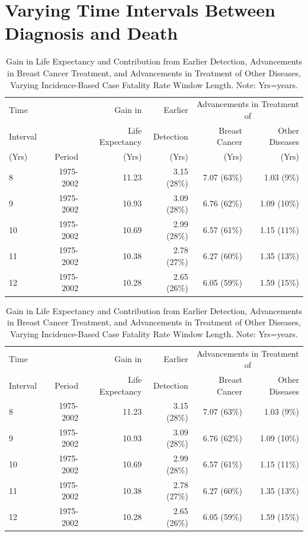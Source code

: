 \documentclass[11pt,letterpaper]{article}
\theoremstyle{plain}
\theoremstyle{remark}
\numberwithin{equation}{section}
\begin{document}
\section{Varying Time Intervals Between Diagnosis and Death}
\begin{center}
  \begin{table}[h]
\begin{tabular}{@{}l rrrrr@{}}
  \toprule
Time & & Gain in & Earlier & \multicolumn{2}{c}{Advancements in Treatment of}\\
 \cmidrule(l{1em}r{1em}){5-6}
Interval &  & Life Expectancy & Detection  & Breast Cancer   & Other Diseases  \\ 
(Yrs) &  Period & (Yrs) & (Yrs) & (Yrs) & (Yrs) \\
  \midrule
  8 & 1975-2002 & 11.23 & 3.15 (28\%) & 7.07 (63\%) & 1.03 (9\%) \\ 
    9 & 1975-2002 & 10.93 & 3.09 (28\%) & 6.76 (62\%) & 1.09 (10\%) \\ 
   10 & 1975-2002 & 10.69 & 2.99 (28\%) & 6.57 (61\%) & 1.15 (11\%) \\ 
   11 & 1975-2002 & 10.38 & 2.78 (27\%) & 6.27 (60\%) & 1.35 (13\%) \\ 
   12 & 1975-2002 & 10.28 & 2.65 (26\%) & 6.05 (59\%) & 1.59 (15\%) \\ 
   \bottomrule
\end{tabular}
\caption{Gain in Life Expectancy and Contribution from Earlier
  Detection, Advancements in Breast Cancer Treatment, and Advancements
  in Treatment of Other Diseases, Varying Incidence-Based Case
  Fatality Rate Window Length.  Note: Yrs=years.}
\end{table}
\end{center}

\begin{center}
  \begin{table}[h]
\begin{tabular}{@{}l rrrrr@{}}
 Time & & Gain in & Earlier & \multicolumn{2}{c}{Advancements in Treatment of}\\
 \cmidrule(l{1em}r{1em}){5-6}
Interval &  Period& Life Expectancy & Detection  & Breast Cancer   & Other Diseases  \\ 
  \midrule
  8 & 1975-2002 & 11.23 & 3.15 (28\%) & 7.07 (63\%) & 1.03 (9\%) \\ 
    9 & 1975-2002 & 10.93 & 3.09 (28\%) & 6.76 (62\%) & 1.09 (10\%) \\ 
   10 & 1975-2002 & 10.69 & 2.99 (28\%) & 6.57 (61\%) & 1.15 (11\%) \\ 
   11 & 1975-2002 & 10.38 & 2.78 (27\%) & 6.27 (60\%) & 1.35 (13\%) \\ 
   12 & 1975-2002 & 10.28 & 2.65 (26\%) & 6.05 (59\%) & 1.59 (15\%) \\ 
   \bottomrule
\end{tabular}
\caption{Gain in Life Expectancy and Contribution from Earlier
  Detection, Advancements in Breast Cancer Treatment, and Advancements
  in Treatment of Other Diseases, Varying Incidence-Based Case
  Fatality Rate Window Length.  Note: Yrs=years.}
\end{table}
\end{center}

\newpage
{} 

\end{document}
